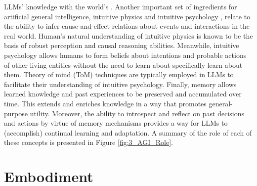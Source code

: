 \documentclass[10pt,journal,compsoc]{IEEEtran}
\begin{document}
	LLMs’ knowledge with the world’s \cite{carta2023grounding}. Another important set of ingredients for artificial general intelligence, intuitive physics \cite{vicovaro2021intuitive,duan2022survey} and intuitive psychology \cite{baron2001intuitive,ross1977intuitive}, relate to the ability to infer cause-and-effect relations about events and interactions in the real world. Human’s natural understanding of intuitive physics is known to be the basis of robust perception and causal reasoning abilities. Meanwhile, intuitive psychology allows humans to form beliefs about intentions and probable actions of other living entities without the need to learn about specifically learn about them. Theory of mind (ToM) techniques \cite{verma2024theory,li2023theory,richards2024you} are typically employed in LLMs to facilitate their understanding of intuitive psychology.  Finally, memory allows learned knowledge and past experiences to be preserved and accumulated over time. This extends and enriches knowledge in a way that promotes general-purpose utility. Moreover, the ability to introspect \cite{toy2024metacognition,qu2024recursive} and reflect \cite{yao2023retroformer} on past decisions and actions by virtue of memory mechanisms provides a way for LLMs to (accomplish) continual learning and adaptation. A summary of the role of each of these concepts is presented in Figure \ref{fig:3_AGI_Role}.
	
	
	
	
	\section{Embodiment}
	
\end{document}
